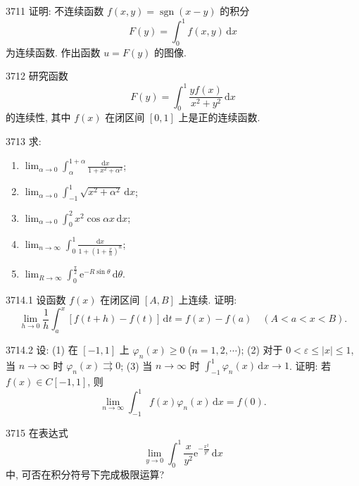 

\begin{prob}[M]{3711}
证明: 不连续函数 $f(x, y) = \operatorname{sgn}(x - y)$ 的积分
\[
F(y) = \int_0^1 f(x, y) \,\mathrm{d}x
\]
为连续函数. 作出函数 $u = F(y)$ 的图像.
\end{prob}

\begin{prob}[M]{3712}
研究函数
\[
F(y) = \int_0^1 \frac{y f(x)}{x^2 + y^2} \,\mathrm{d}x
\]
的连续性, 其中 $f(x)$ 在闭区间 $[0, 1]$ 上是正的连续函数.
\end{prob}

\begin{prob}[L]{3713}
求:
\begin{enumerate}[label=(\alph*), itemsep=2pt, topsep=3pt]
\item $\displaystyle \lim_{\alpha \to 0} \int_\alpha^{1+\alpha} \frac{\mathrm{d}x}{1 + x^2 + \alpha^2}$;
\item $\displaystyle \lim_{\alpha \to 0} \int_{-1}^1 \sqrt{x^2 + \alpha^2} \,\mathrm{d}x$;
\item $\displaystyle \lim_{\alpha \to 0} \int_0^2 x^2 \cos \alpha x \,\mathrm{d}x$;
\item $\displaystyle \lim_{n \to \infty} \int_0^1 \frac{\mathrm{d}x}{1 + \left(1 + \frac{x}{n}\right)^n}$;
\item $\displaystyle \lim_{R \to \infty} \int_0^{\frac{\pi}{2}} \mathrm{e}^{-R \sin \theta} \,\mathrm{d}\theta$.
\end{enumerate}
\end{prob}

\begin{prob}[M]{3714.1}
设函数 $f(x)$ 在闭区间 $[A, B]$ 上连续. 证明:
\[
\lim_{h \to 0} \frac{1}{h} \int_a^x [f(t + h) - f(t)] \,\mathrm{d}t = f(x) - f(a) \quad (A < a < x < B).
\]
\end{prob}

\begin{prob}[M]{3714.2}
设: (1) 在 $[-1, 1]$ 上 $\varphi_n(x) \geqslant 0$ ($n = 1, 2, \cdots$); (2) 对于 $0 < \varepsilon \leqslant |x| \leqslant 1$, 当 $n \to \infty$ 时 $\varphi_n(x) \rightrightarrows 0$; (3) 当 $n \to \infty$ 时 $\displaystyle \int_{-1}^1 \varphi_n(x) \,\mathrm{d}x \to 1$. 证明: 若 $f(x) \in C[-1, 1]$, 则
\[
\lim_{n \to \infty} \int_{-1}^1 f(x) \varphi_n(x) \,\mathrm{d}x = f(0).
\]
\end{prob}

\begin{prob}[M]{3715}
在表达式
\[
\lim_{y \to 0} \int_0^1 \frac{x}{y^2} \mathrm{e}^{-\frac{x^2}{y^2}} \,\mathrm{d}x
\]
中, 可否在积分符号下完成极限运算?
\end{prob}

